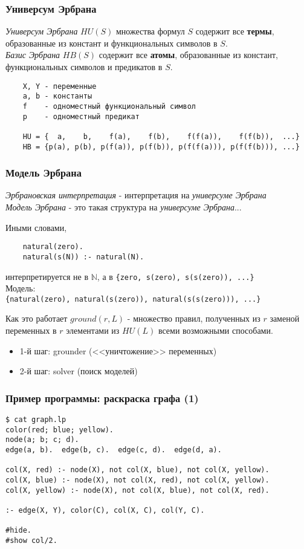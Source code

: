 \documentclass{beamer}
\begin{document}
\begin{frame}[fragile]
\frametitle{Универсум Эрбрана}
\textit{Универсум Эрбрана} $HU(S)$ множества формул $S$ содержит все \textbf{термы}, образованные из констант и функциональных символов в $S$.\\
\textit{Базис Эрбрана} $HB(S)$ содержит все \textbf{атомы}, образованные из констант, функциональных символов и предикатов в $S$.\\
\bigskip

{\footnotesize \begin{verbatim}
    X, Y - переменные
    a, b - константы
    f    - одноместный функциональный символ
    p    - одноместный предикат
    
    HU = {  a,    b,    f(a),    f(b),    f(f(a)),    f(f(b)),  ...}
    HB = {p(a), p(b), p(f(a)), p(f(b)), p(f(f(a))), p(f(f(b))), ...} 
\end{verbatim}}
\end{frame}

\begin{frame}[fragile]
\frametitle{Модель Эрбрана}
\textit{Эрбрановская интерпретация} - интерпретация на \textit{универсуме Эрбрана}\\
\textit{Модель Эрбрана} - это такая структура на \textit{универсуме Эрбрана}...\bigskip

Иными словами, 
{\footnotesize \begin{verbatim}
    natural(zero).
    natural(s(N)) :- natural(N).
\end{verbatim}}
интерпретируется не в $\mathbb{N}$, а в {\footnotesize \texttt{\{zero, s(zero), s(s(zero)), ...\}}}\\
\bigskip
Модель:\\ {\footnotesize \texttt{\{natural(zero), natural(s(zero)), natural(s(s(zero))), ...\}}}
\end{frame}


\begin{frame}{Как это работает}
$ground(r, L)$ - множество правил, полученных из $r$ заменой переменных в $r$ элементами из $HU(L)$ всеми возможными способами.

\begin{itemize}
  \item 1-й шаг: grounder (<<уничтожение>> переменных)
  \item 2-й шаг: solver (поиск моделей)
\end{itemize}\bigskip
\end{frame}


\begin{frame}[fragile]
\frametitle{Пример программы: раскраска графа (1)}
{\footnotesize \begin{verbatim}
$ cat graph.lp
color(red; blue; yellow).
node(a; b; c; d).
edge(a, b).  edge(b, c).  edge(c, d).  edge(d, a).

col(X, red) :- node(X), not col(X, blue), not col(X, yellow).
col(X, blue) :- node(X), not col(X, red), not col(X, yellow).
col(X, yellow) :- node(X), not col(X, blue), not col(X, red).

:- edge(X, Y), color(C), col(X, C), col(Y, C).

#hide.
#show col/2.
\end{verbatim}}
\end{frame}
\end{document}
